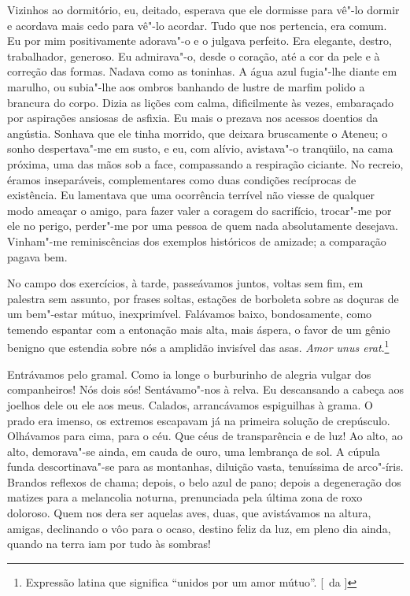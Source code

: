 Vizinhos ao dormitório, eu, deitado, esperava que ele dormisse
para vê"-lo dormir e acordava mais cedo para vê"-lo acordar. Tudo que
nos pertencia, era comum. Eu por mim positivamente adorava"-o e o
julgava perfeito. Era elegante, destro, trabalhador, generoso. Eu
admirava"-o, desde o coração, até a cor da pele e à correção das
formas. Nadava como as toninhas. A água azul fugia"-lhe diante em
marulho, ou subia"-lhe aos ombros banhando de lustre de marfim polido
a brancura do corpo. Dizia as lições com calma, dificilmente às vezes,
embaraçado por aspirações ansiosas de asfixia. Eu mais o prezava nos
acessos doentios da angústia. Sonhava que ele tinha morrido, que
deixara bruscamente o Ateneu; o sonho despertava"-me em susto, e eu,
com alívio, avistava"-o tranqüilo, na cama próxima, uma das mãos sob a
face, compassando a respiração ciciante. No recreio, éramos
inseparáveis, complementares como duas condições recíprocas de
existência. Eu lamentava que uma ocorrência terrível não viesse de
qualquer modo ameaçar o amigo, para fazer valer a coragem do
sacrifício, trocar"-me por ele no perigo, perder"-me por uma pessoa
de quem nada absolutamente desejava. Vinham"-me reminiscências dos
exemplos históricos de amizade; a comparação pagava bem. 

No campo dos exercícios, à tarde, passeávamos juntos, voltas sem fim, em palestra
sem assunto, por frases soltas, estações de borboleta sobre as doçuras
de um bem"-estar mútuo, inexprimível. Falávamos baixo, bondosamente,
como temendo espantar com a entonação mais alta, mais áspera, o favor
de um gênio benigno que estendia sobre nós a amplidão invisível das
asas. \textit{Amor unus erat}.\footnote{ Expressão latina que significa 
``unidos por um amor mútuo''. [~da ]} 

Entrávamos pelo gramal. Como ia longe o
burburinho de alegria vulgar dos companheiros! Nós dois sós!
Sentávamo"-nos à relva. Eu descansando a cabeça aos joelhos dele ou
ele aos meus. Calados, arrancávamos espiguilhas à grama. O prado era
imenso, os extremos escapavam já na primeira solução de crepúsculo.
Olhávamos para cima, para o céu. Que céus de transparência e de luz! Ao
alto, ao alto, demorava"-se ainda, em cauda de ouro, uma lembrança de
sol. A cúpula funda descortinava"-se para as montanhas, diluição
vasta, tenuíssima de arco"-íris. Brandos reflexos de chama; depois, o
belo azul de pano; depois a degeneração dos matizes para a melancolia
noturna, prenunciada pela última zona de roxo doloroso. Quem nos dera
ser aquelas aves, duas, que avistávamos na altura, amigas, declinando o
vôo para o ocaso, destino feliz da luz, em pleno dia ainda, quando na
terra iam por tudo às sombras! 

